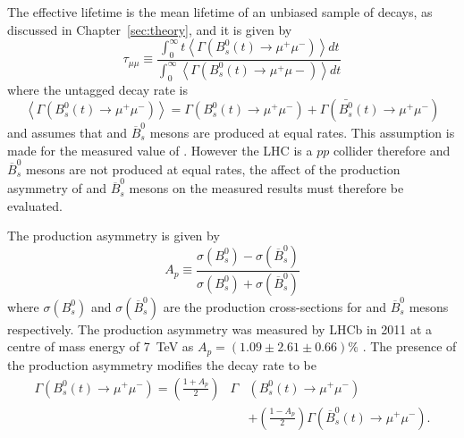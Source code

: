 The \bsmumu effective lifetime is the mean lifetime of an unbiased sample of \bsmumu decays, as discussed in Chapter~\ref{sec:theory}, and it is given by
\begin{equation}
 \tau_{\mu\mu} \equiv \frac{\int^\infty_0 t \left<\Gamma \left( B^{0}_s(t) \rightarrow \mu^{+} \mu^{-} \right) \right> dt }{\int^\infty_0 \left<\Gamma \left( B^{0}_s(t) \rightarrow \mu^{+} \mu{-} \right) \right> dt }
\label{eq:el}
\end{equation}
where the untagged decay rate is
\begin{equation}
\left< \Gamma \left( B^0_s(t) \rightarrow \mu^{+} \mu^{-} \right)\right>  = \Gamma \left ( B^0_s(t) \rightarrow \mu^{+}\mu^{-} \right) + \Gamma \left ( \bar{B^0_s}(t) \rightarrow \mu^{+} \mu^{-} \right)
\end{equation}
and assumes that \bs and $\overline{B}^{0}_{s}$ mesons are produced at equal rates. This assumption is made for the measured value of \tmumu. However the LHC is a $pp$ collider therefore \bs and $\overline{B}^{0}_{s}$ mesons are not produced at equal rates, the affect of the production asymmetry of \bs and $\overline{B}^{0}_{s}$ mesons on the measured results must therefore be evaluated. 

The production asymmetry is given by 
\begin{equation}
 A_{p} \equiv \frac{\sigma\left(B^{0}_{s}\right) - \sigma\left(\overline{B}^{0}_{s}\right)}{\sigma\left(B^{0}_{s}\right) + \sigma\left(\overline{B}^{0}_{s}\right)}
\label{eq:Ap}
\end{equation}
where $\sigma\left(B^{0}_{s}\right)$ and $\sigma\left(\overline{B}^{0}_{s}\right)$ are the production cross-sections for \bs and $\overline{B}^{0}_{s}$ mesons respectively. The production asymmetry was measured by LHCb in 2011 at a centre of mass energy of 7~TeV as $ A_{p} = (1.09 \pm 2.61 \pm 0.66) \%$ \cite{Aaij:2014bba}. The presence of the production asymmetry modifies the \bsmumu decay rate to be
\begin{eqnarray}
\Gamma\left( B^0_s(t) \rightarrow \mu^{+}\mu^{-}\right) = \left(\frac{1+A_p}{2}\right)&\Gamma&(B^0_s(t)\rightarrow \mu^{+} \mu^{-}) \nonumber \\
& & + \left(\frac{1-A_p}{2}\right)\Gamma(\overline{B}^0_s(t)\rightarrow \mu^{+} \mu^{-}).
\label{eq:modifieddecayrate}
\end{eqnarray}

